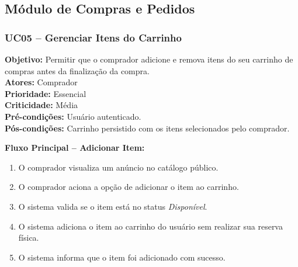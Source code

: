 \documentclass[
	article,			%
	11pt,				%
	oneside,			%
	a4paper,			%
	english,			%
	brazil,				%
	sumario=tradicional
	]{abntex2}
\begin{document}
\subsection{Módulo de Compras e Pedidos}

\subsubsection{UC05 – Gerenciar Itens do Carrinho}
\label{uc:09}
\noindent\textbf{Objetivo:} Permitir que o comprador adicione e remova itens do seu carrinho de compras antes da finalização da compra.\\
\textbf{Atores:} Comprador\\
\textbf{Prioridade:} Essencial\\
\textbf{Criticidade:} Média\\
\textbf{Pré-condições:} Usuário autenticado.\\
\textbf{Pós-condições:} Carrinho persistido com os itens selecionados pelo comprador.

\vspace{0.5em}
\noindent\textbf{Fluxo Principal – Adicionar Item:}
\begin{enumerate}[label=\arabic*.]
    \item O comprador visualiza um anúncio no catálogo público.
    \item O comprador aciona a opção de adicionar o item ao carrinho.
    \item O sistema valida se o item está no status \textit{Disponível}.
    \item O sistema adiciona o item ao carrinho do usuário sem realizar sua reserva física.
    \item O sistema informa que o item foi adicionado com sucesso.
\end{enumerate}
\end{document}
